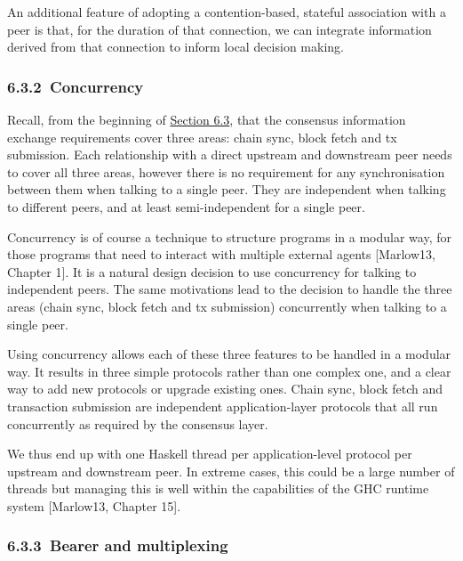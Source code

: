 \documentclass[11pt,a4paper]{article}
\begin{document}
An additional feature of adopting a contention-based, stateful
association with a peer is that, for the duration of that connection, we
can integrate information derived from that connection to inform local
decision making.

\hypertarget{concurrency}{%
\subsubsection{​6.3.2​~Concurrency}\label{concurrency}}

Recall, from the beginning of
\protect\hyperlink{network-constraints-and-design-decisions}{{Section
6.3}}, that the consensus information exchange requirements cover three
areas: chain sync, block fetch and tx submission. Each relationship with
a direct upstream and downstream peer needs to cover all three areas,
however there is no requirement for any synchronisation between them
when talking to a single peer. They are independent when talking to
different peers, and at least semi-independent for a single peer.

Concurrency is of course a technique to structure programs in a modular
way, for those programs that need to interact with multiple external
agents {[}Marlow13, Chapter 1{]}. It is a natural design decision to use
concurrency for talking to independent peers. The same motivations lead
to the decision to handle the three areas (chain sync, block fetch and
tx submission) concurrently when talking to a single peer.

Using concurrency allows each of these three features to be handled in a
modular way. It results in three simple protocols rather than one
complex one, and a clear way to add new protocols or upgrade existing
ones. Chain sync, block fetch and transaction submission are independent
application-layer protocols that all run concurrently as required by the
consensus layer.

We thus end up with one Haskell thread per application-level protocol
per upstream and downstream peer. In extreme cases, this could be a
large number of threads but managing this is well within the
capabilities of the GHC runtime system {[}Marlow13, Chapter 15{]}.

\hypertarget{bearer-and-multiplexing}{%
\subsubsection{​6.3.3​~Bearer and
multiplexing}\label{bearer-and-multiplexing}}
\end{document}
